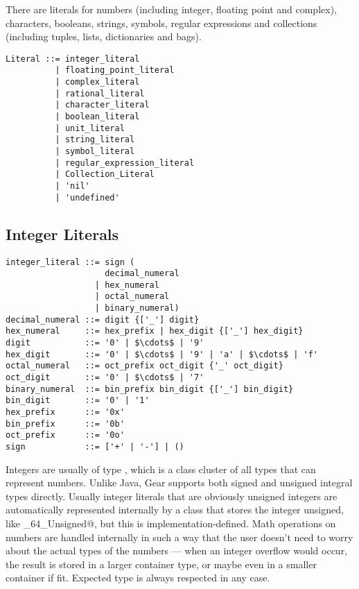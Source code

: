 There are literals for numbers (including integer, floating point and complex), characters, booleans, strings, symbols, regular expressions and collections (including tuples, lists, dictionaries and bags). 

\syntax\begin{lstlisting}
Literal ::= integer_literal
	      | floating_point_literal
	      | complex_literal
	      | rational_literal
	      | character_literal
	      | boolean_literal
	      | unit_literal
	      | string_literal
	      | symbol_literal
	      | regular_expression_literal
	      | Collection_Literal
	      | 'nil'
	      | 'undefined'
\end{lstlisting}






\subsection{Integer Literals}\label{sec:integerliterals}

\syntax\begin{lstlisting}
integer_literal ::= sign (
                    decimal_numeral
                  | hex_numeral
                  | octal_numeral
                  | binary_numeral)
decimal_numeral ::= digit {['_'] digit}
hex_numeral     ::= hex_prefix | hex_digit {['_'] hex_digit}
digit           ::= '0' | $\cdots$ | '9'
hex_digit       ::= '0' | $\cdots$ | '9' | 'a' | $\cdots$ | 'f'
octal_numeral   ::= oct_prefix oct_digit {'_' oct_digit}
oct_digit       ::= '0' | $\cdots$ | '7'
binary_numeral  ::= bin_prefix bin_digit {['_'] bin_digit}
bin_digit       ::= '0' | '1'
hex_prefix      ::= '0x'
bin_prefix      ::= '0b'
oct_prefix      ::= '0o'
sign            ::= ['+' | '-'] | ()
\end{lstlisting}

Integers are usually of type \lstinline@Number@, which is a class cluster of all types that can represent numbers. Unlike Java, Gear supports both signed and unsigned integral types directly. Usually integer literals that are obviously unsigned integers are automatically represented internally by a class that stores the integer unsigned, like \lstinline@Integer_64_Unsigned@, but this is implementation-defined. Math operations on numbers are handled internally in such a way that the user doesn't need to worry about the actual types of the numbers — when an integer overflow would occur, the result is stored in a larger container type, or maybe even in a smaller container if fit. Expected type is always respected in any case. 

